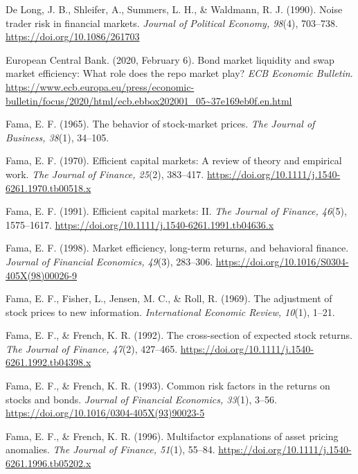\documentclass[11pt,a4paper]{article}
\begin{document}
\begin{fshfreferences}
\item De Long, J. B., Shleifer, A., Summers, L. H., \& Waldmann, R. J. (1990). Noise trader risk in financial markets. \textit{Journal of Political Economy, 98}(4), 703--738. \url{https://doi.org/10.1086/261703}

\item European Central Bank. (2020, February 6). Bond market liquidity and swap market efficiency: What role does the repo market play? \textit{ECB Economic Bulletin}. \url{https://www.ecb.europa.eu/press/economic-bulletin/focus/2020/html/ecb.ebbox202001_05~37e169eb0f.en.html}

\item Fama, E. F. (1965). The behavior of stock-market prices. \textit{The Journal of Business, 38}(1), 34--105.

\item Fama, E. F. (1970). Efficient capital markets: A review of theory and empirical work. \textit{The Journal of Finance, 25}(2), 383--417. \url{https://doi.org/10.1111/j.1540-6261.1970.tb00518.x}

\item Fama, E. F. (1991). Efficient capital markets: II. \textit{The Journal of Finance, 46}(5), 1575--1617. \url{https://doi.org/10.1111/j.1540-6261.1991.tb04636.x}

\item Fama, E. F. (1998). Market efficiency, long-term returns, and behavioral finance. \textit{Journal of Financial Economics, 49}(3), 283--306. \url{https://doi.org/10.1016/S0304-405X(98)00026-9}

\item Fama, E. F., Fisher, L., Jensen, M. C., \& Roll, R. (1969). The adjustment of stock prices to new information. \textit{International Economic Review, 10}(1), 1--21.

\item Fama, E. F., \& French, K. R. (1992). The cross-section of expected stock returns. \textit{The Journal of Finance, 47}(2), 427--465. \url{https://doi.org/10.1111/j.1540-6261.1992.tb04398.x}

\item Fama, E. F., \& French, K. R. (1993). Common risk factors in the returns on stocks and bonds. \textit{Journal of Financial Economics, 33}(1), 3--56. \url{https://doi.org/10.1016/0304-405X(93)90023-5}

\item Fama, E. F., \& French, K. R. (1996). Multifactor explanations of asset pricing anomalies. \textit{The Journal of Finance, 51}(1), 55--84. \url{https://doi.org/10.1111/j.1540-6261.1996.tb05202.x}


\end{fshfreferences}
\end{document}
